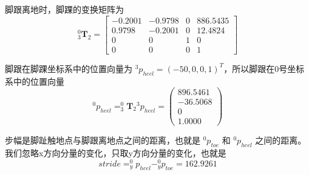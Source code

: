 \documentclass{homework}
\begin{document}
\begin{sol}
脚跟离地时，脚踝的变换矩阵为
\[
 _3^0\mathbf{T}_2 = 
 \begin{bmatrix} 
    -0.2001 & -0.9798 & 0 & 886.5435 \\ 
    0.9798 & -0.2001 & 0 & 12.4824 \\ 
    0 & 0 & 1 & 0 \\ 
    0 & 0 & 0 & 1
  \end{bmatrix}
\]

脚跟在脚踝坐标系中的位置向量为 $ ^{3}p_{heel} = (-50, 0, 0, 1)^T $，所以脚跟在0号坐标系中的位置向量
\[
 ^{0}p_{heel} = _3^0\mathbf{T}{_2} ^{3}p_{heel} = 
 \begin{pmatrix} 
    896.5461 \\
    -36.5068 \\
    0 \\
    1.0000
  \end{pmatrix}
\]

步幅是脚趾触地点与脚跟离地点之间的距离，也就是 $ ^{0}p_{toe} $ 和 $ ^{0}p_{heel} $ 之间的距离。我们忽略x方向分量的变化，只取y方向分量的变化，也就是
\[
  stride = ^{0}_{y}p_{heel} - ^{0}_{y}p_{toe} = 162.9261
\]
  
\end{sol}

\question 
\end{document}
